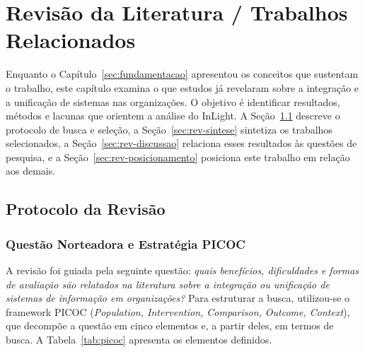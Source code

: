 \chapter{Revisão da Literatura / Trabalhos Relacionados}
\label{sec:revisao}

Enquanto o Capítulo~\ref{sec:fundamentacao} apresentou os conceitos que sustentam o trabalho, este capítulo examina o que estudos já revelaram sobre a integração e a unificação de sistemas nas organizações. O objetivo é identificar resultados, métodos e lacunas que orientem a análise do InLight. A Seção~\ref{sec:rev-protocolo} descreve o protocolo de busca e seleção, a Seção~\ref{sec:rev-sintese} sintetiza os trabalhos selecionados, a Seção~\ref{sec:rev-discussao} relaciona esses resultados às questões de pesquisa, e a Seção~\ref{sec:rev-posicionamento} posiciona este trabalho em relação aos demais.

\section{Protocolo da Revisão}
\label{sec:rev-protocolo}

\subsection{Questão Norteadora e Estratégia PICOC}

A revisão foi guiada pela seguinte questão: \textit{quais benefícios, dificuldades e formas de avaliação são relatados na literatura sobre a integração ou unificação de sistemas de informação em organizações?} Para estruturar a busca, utilizou-se o framework PICOC (\textit{Population, Intervention, Comparison, Outcome, Context}), que decompõe a questão em cinco elementos e, a partir deles, em termos de busca. A Tabela~\ref{tab:picoc} apresenta os elementos definidos.

